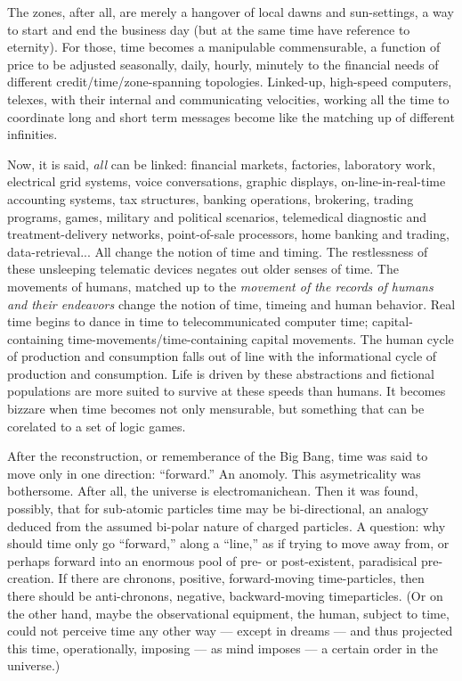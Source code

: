 The zones, after all, are merely a hangover
of local dawns and sun-settings, a way to
start and end the business day (but at the
same time have reference to eternity). For
those, time becomes a manipulable commensurable, a function of price to be adjusted
seasonally, daily, hourly, minutely to the financial needs of different credit\slash time\slash zone-spanning topologies. Linked-up, high-speed
computers, telexes, with their internal and
communicating velocities, working all the
time to coordinate long and short term messages become like the matching up of different infinities.

Now, it is said, \emph{all} can be linked: financial
markets, factories, laboratory work, electrical grid systems, voice conversations, graphic
displays, on-line-in-real-time accounting
systems, tax structures, banking operations,
brokering, trading programs, games, military and political scenarios, telemedical
diagnostic and treatment-delivery networks,
point-of-sale processors, home banking and
trading, data-retrieval... All change the notion of time and timing. The restlessness of
these unsleeping telematic devices negates
out older senses of time. The movements of
humans, matched up to the \emph{movement of the records of humans and their endeavors}
change the notion of time, timeing and human behavior. Real time begins to dance in
time to telecommunicated computer time;
capital-containing time-movements\slash time-containing capital movements. The human
cycle of production and consumption falls
out of line with the informational cycle of
production and consumption. Life is driven
by these abstractions and fictional populations are more suited to survive at these
speeds than humans. It becomes bizzare
when time becomes not only mensurable,
but something that can be corelated to a set
of logic games.

After the reconstruction, or rememberance
of the Big Bang, time was said to move only
in one direction: \enquote{forward.} An anomoly.
This asymetricality was bothersome. After
all, the universe is electromanichean. Then
it was found, possibly, that for sub-atomic
particles time may be bi-directional, an analogy deduced from the assumed bi-polar nature of charged particles. A question: why
should time only go \enquote{forward,} along a
\enquote{line,} as if trying to move away from, or
perhaps forward into an enormous pool of
pre- or post-existent, paradisical pre-creation.
If there are chronons, positive, forward-moving time-particles, then there should be anti-chronons, negative, backward-moving timeparticles. (Or on the other hand, maybe the
observational equipment, the human, subject to time, could not perceive time any
other way --- except in dreams --- and thus projected this time, operationally, imposing ---
as mind imposes --- a certain order in the universe.)

